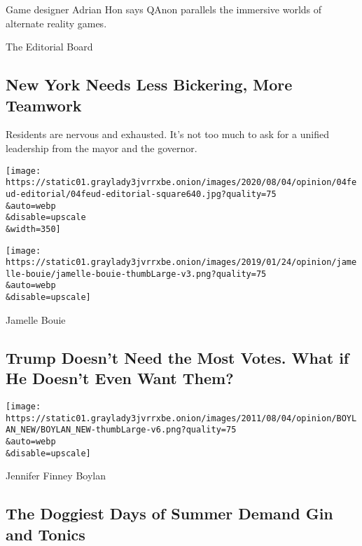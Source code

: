 Game designer Adrian Hon says QAnon parallels the immersive worlds of
alternate reality games.

\href{/2020/08/04/opinion/cuomo-de-blasio-coronavirus-nyc.html}{}

The Editorial Board

\hypertarget{new-york-needs-less-bickering-more-teamwork}{%
\subsection{New York Needs Less Bickering, More
Teamwork}\label{new-york-needs-less-bickering-more-teamwork}}

Residents are nervous and exhausted. It's not too much to ask for a
unified leadership from the mayor and the governor.

\href{/2020/08/04/opinion/cuomo-de-blasio-coronavirus-nyc.html}{}

\texttt{[image: https://static01.graylady3jvrrxbe.onion/images/2020/08/04/opinion/04feud-editorial/04feud-editorial-square640.jpg?quality=75\\\&auto=webp\\\&disable=upscale\\\&width=350]}

\href{/2020/08/04/opinion/trump-2020-electoral-college.html}{}

\texttt{[image: https://static01.graylady3jvrrxbe.onion/images/2019/01/24/opinion/jamelle-bouie/jamelle-bouie-thumbLarge-v3.png?quality=75\\\&auto=webp\\\&disable=upscale]}

Jamelle Bouie

\hypertarget{trump-doesnt-need-the-most-votes-what-if-he-doesnt-even-want-them}{%
\subsection{Trump Doesn't Need the Most Votes. What if He Doesn't Even
Want
Them?}\label{trump-doesnt-need-the-most-votes-what-if-he-doesnt-even-want-them}}

\href{/2020/08/04/opinion/gin-tonic-summer-drink.html}{}

\texttt{[image: https://static01.graylady3jvrrxbe.onion/images/2011/08/04/opinion/BOYLAN\_NEW/BOYLAN\_NEW-thumbLarge-v6.png?quality=75\\\&auto=webp\\\&disable=upscale]}

Jennifer Finney Boylan

\hypertarget{the-doggiest-days-of-summer-demand-gin-and-tonics}{%
\subsection{The Doggiest Days of Summer Demand Gin and
Tonics}\label{the-doggiest-days-of-summer-demand-gin-and-tonics}}

